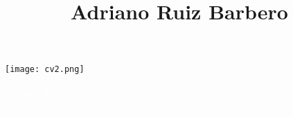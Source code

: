 \documentclass[11pt, oneside, a4paper, titlepage]{article}
\title{Adriano Ruiz Barbero}
\begin{document}

\begin{tcolorbox} \begin{minipage}{4.5cm}
\hspace*{-0.3cm}
\texttt{[image: cv2.png]} 
\end{minipage}
\begin{minipage}{15cm} 
	\begin{center} 
		\Huge{\textcolor{white}{Adriano Ruiz
	Barbero}} \\ 
		\vspace*{0.5cm} 
		\Large{\textcolor{white}{\emph{Desarrollador
	de software}}} 
	\end{center} 
\end{minipage} 
\end{tcolorbox}
\end{document}
